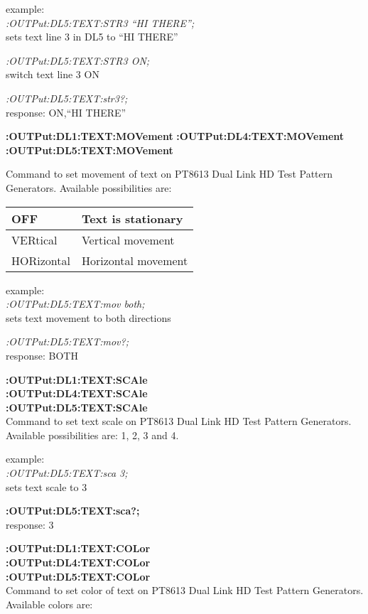 example:\\
\textit{:OUTPut:DL5:TEXT:STR3 ``HI THERE'';}\\
sets text line 3 in DL5 to ``HI THERE''

\textit{:OUTPut:DL5:TEXT:STR3 ON;}\\
switch text line 3 ON

\textit{:OUTPut:DL5:TEXT:str3?;}\\
response: ON,``HI THERE''

\textbf{:OUTPut:DL1:TEXT:MOVement}
\textbf{:OUTPut:DL4:TEXT:MOVement}
\textbf{:OUTPut:DL5:TEXT:MOVement}

Command to set movement of text on PT8613 Dual Link HD Test Pattern Generators. Available possibilities are:

\begin{tabular}{|l|l|}
\hline
OFF         & Text is stationary\\ \hline
VERtical    & Vertical movement\\ \hline
HORizontal  & Horizontal movement\\ \hline
\end{tabular}

example:\\
\textit{:OUTPut:DL5:TEXT:mov both; }\\
sets text movement to both directions

\textit{:OUTPut:DL5:TEXT:mov?;}\\
response: BOTH

\textbf{:OUTPut:DL1:TEXT:SCAle}\\
\textbf{:OUTPut:DL4:TEXT:SCAle}\\
\textbf{:OUTPut:DL5:TEXT:SCAle}\\

Command to set text scale on PT8613 Dual Link HD Test Pattern Generators. Available possibilities are: 1, 2, 3 and 4.

example:\\
\textit{:OUTPut:DL5:TEXT:sca 3;}\\
sets text scale to 3

\textbf{:OUTPut:DL5:TEXT:sca?; }\\
response: 3

\textbf{:OUTPut:DL1:TEXT:COLor}\\
\textbf{:OUTPut:DL4:TEXT:COLor}\\
\textbf{:OUTPut:DL5:TEXT:COLor}\\
Command to set color of text on PT8613 Dual Link HD Test Pattern Generators. Available colors are:

